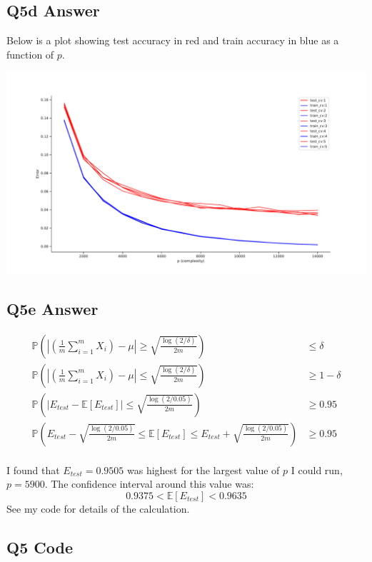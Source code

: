 \documentclass{article}
\newcommand{\1}{\mathbf{1}}
\renewcommand{\P}{\mathbb{P}} %
\def\E{\mathbb{E}}
\def\P{\mathbb{P}}
\begin{document}
\subsection{Q5d Answer}
Below is a plot showing test accuracy in red and train accuracy in blue as a function of $p$. 
\begin{center}
    \includegraphics[width=\textwidth]{hw1/P3.pdf}
\end{center}

\subsection{Q5e Answer}

\begin{align*}
\P\left( \left| \left(\frac{1}{m} \sum_{i=1}^m X_i\right) - \mu \right| \geq \sqrt{\frac{\log(2/\delta)}{2m}} \right) & \leq \delta \\
\P\left( \left| \left(\frac{1}{m} \sum_{i=1}^m X_i\right) - \mu \right| \leq \sqrt{\frac{\log(2/\delta)}{2m}} \right) & \geq 1 - \delta \\
\P\left( \left| E_{test} - \E[E_{test}] \right| \leq \sqrt{\frac{\log(2/0.05)}{2m}} \right) & \geq 0.95 \\
\P\left( E_{test} - \sqrt{\frac{\log(2/0.05)}{2m}} \leq  \E[E_{test}]  \leq E_{test} + \sqrt{\frac{\log(2/0.05)}{2m}} \right) & \geq 0.95 \\
\end{align*}

I found that $E_{test}=0.9505$ was highest for the largest value of $p$ I could run, $p=5900$. 
The confidence interval around this value was:
$$ 0.9375 < \E[E_{test}] < 0.9635	$$
See my code for details of the calculation. 

\subsection{Q5 Code}

\end{document}

